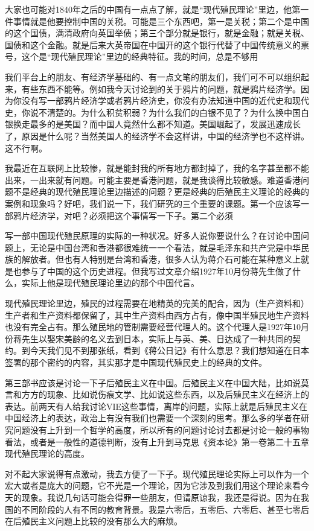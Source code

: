 \documentclass[UTF8, 12pt, a4paper]{ctexrep}
\begin{document}
大家也可能对1840年之后的中国有一点点了解，就是“现代殖民理论”里边，他第一件事情就是他要控制中国的关税。可能是三个东西吧，第一是关税；第二个是中国的这个国债，满清政府向英国举债；第三个部分就是银行，就是金融；就是关税、国债和这个金融。就是后来大英帝国在中国开的这个银行代替了中国传统意义的票号，这个是“现代殖民理论”里边的经典特征。我的时间，总是不够用

我们平台上的朋友、有经济学基础的、有一点文笔的朋友们，我们可不可以组织起来，有些东西不能等。例如我今天讨论到的关于鸦片的问题，就是鸦片经济学。因为你没有写一部鸦片经济学或者鸦片经济史，你没有办法知道中国的近代史和现代史，你说不清楚的。为什么积贫积弱？为什么我们的白银不见了？为什么换中国白银换走最多的是美国？而中国人竟然什么都不知道。美国崛起了，发展迅速成长了，原因是什么呢？当然美国人的经济学不会这样讲，中国的经济学也不这样讲。这不行啊。

我最近在互联网上比较惨，就是能封我的所有地方都封掉了，我的名字甚至都不能出来，一出来就有问题。可能主要是香港问题，就是我谈得比较敏感。难道香港问题不是经典的现代殖民理论里边描述的问题？更是经典的后殖民主义理论的经典的案例和现象吗？好吧，我们说一下，我们研究的三个重要的课题。第一个应该写一部鸦片经济学，对吧？必须把这个事情写一下子。第二个必须

写一部中国现代殖民原理的实际的一种状况。好多人说你要说什么？在讨论中国问题上，无论是中国台湾和香港都很难统一一个看法，就是毛泽东和共产党是中华民族的解放者。但也有人特别是台湾和香港，很多人认为蒋介石可能在某种意义上就是也参与了中国的这个历史进程。但我写过文章介绍1927年10月份蒋先生做了什么，实际上他是现代殖民理论里边的那个中国代言。

现代殖民理论里边，殖民的过程需要在地精英的完美的配合，因为（生产资料和）生产者和生产资料都保留了，其中生产资料由西方占有，像中国半殖民地生产资料也没有完全占有。那么殖民地的管制需要经营代理人的。这个代理人是1927年10月份蒋先生以娶宋美龄的名义去到日本，实际上与英、美、日达成了一种共同的契约。到今天我们见不到那张纸，看到《蒋公日记》有什么意思？我们想知道在日本签署的那个密约的内容，其实那才是中国现代殖民史上的经典的文件。

第三部书应该是讨论一下子后殖民主义在中国。后殖民主义在中国大陆，比如说莫言和方方的现象、比如说伤痕文学、比如说这些东西，以及后殖民主义在经济上的表达。前两天有人给我讨论VIE这些事情，离岸的问题，实际上就是后殖民主义在中国经济上的表达，政治上有没有我们也需要一个深刻的思考。那么多的学者在研究问题没有上升到一个哲学的高度，所以所有的问题讨论讨去都是讨论一般的事物看法，或者是一般性的道德判断，没有上升到马克思《资本论》第一卷第二十五章现代殖民理论的高度。

对不起大家说得有点激动，我去方便了一下子。现代殖民理论实际上可以作为一个宏大或者是庞大的问题，它不光是一个理论，因为它涉及到我们用这个理论来看今天的现象。我说几句话可能会得罪一些朋友，但请原谅我，我还是得说。因为在我国的不同阶段的人有不同的教育背景。我是六零后，五零后、六零后、甚至七零后在后殖民主义问题上比较的没有那么大的麻烦。
\end{document}
